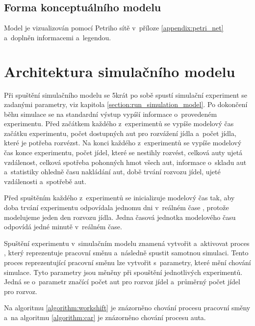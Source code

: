 \documentclass[a4paper, 11pt]{article}
\begin{document}
	\subsection{Forma konceptuálního modelu}

	Model je vizualizován pomocí Petriho sítě v~příloze
	\ref{appendix:petri_net} a~doplněn informacemi a~legendou.



	\section{Architektura simulačního modelu}
	\label{section:simulation_model_architecture}

	Při spuštění simulačního modelu \cite[snímek 44]{IMS_slides} se 5krát
	po sobě spustí simulační experiment se zadanými parametry,
	viz kapitola \ref{section:run_simulation_model}. Po dokončení
	běhu simulace se na standardní výstup vypíší informace o~provedeném
	experimentu. Před začátkem každého z~experimentů se vypíše modelový
	čas \cite[snímek 21]{IMS_slides} začátku experimentu, počet dostupných
	aut pro rozvážení jídla a~počet jídla, které je potřeba rozvézst. Na
	konci každého z~experimentů se vypíše modelový čas konce experimentu,
	počet jídel, které se nestihly rozvést, celková auty ujetá vzdálenost,
	celková spotřeba pohonných hmot všech aut, informace o~skladu
	\cite[snímek 184]{IMS_slides} aut a~statistiky ohledně času nakládání aut,
	době trvání rozvozu jídel, ujeté vzdálenosti a~spotřebě aut.

	Před spuštěním každého z~experimentů se inicializuje modelový čas tak, aby
	doba trvání experimentu odpovídala jednomu dni v~reálném čase
	\cite[snímek 21]{IMS_slides}, protože modelujeme jeden den rozvozu jídla.
	Jedna časová jednotka modelového času odpovídá jedné minutě v~reálném
	čase.

	Spuštění experimentu v~simulačním modelu znamená vytvořit a~aktivovat
	proces \cite[snímek 121]{IMS_slides}, který reprezentuje pracovní směnu
	a~následně spustit samotnou simulaci. Tento proces reprezentující
	pracovní směnu lze vytvořit s~parametry, které mění chování simulace.
	Tyto parametry jsou měněny při spouštění jednotlivých experimentů. Jedná
	se o~parametr značící počet aut pro rozvoz jídel a~průměrný počet jídel
	pro rozvoz.

	Na algoritmu \ref{algorithm:workshift} je znázorněno chování procesu
	pracovní směny a~na algoritmu \ref{algorithm:car} je znázorněno chování
	procesu auta. \\
\end{document}
